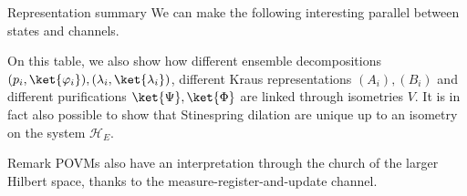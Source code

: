 \documentclass[a4paper]{article}
\begin{document}
\begin{parag}{Representation summary}
    We can make the following interesting parallel between states and channels.

    On this table, we also show how different ensemble decompositions $\left(p_i, \ket{\phi_i}\right), \left(\lambda_i, \ket{\lambda_i}\right)$, different Kraus representations $\left(A_i\right), \left(B_i\right)$ and different purifications $\ket{\Psi}, \ket{\Phi}$ are linked through isometries $V$. It is in fact also possible to show that Stinespring dilation are unique up to an isometry on the system $\mathcal{H}_E$.

    \begin{subparag}{Remark}
        POVMs also have an interpretation through the church of the larger Hilbert space, thanks to the measure-register-and-update channel.
    \end{subparag}
\end{parag}
\end{document}
